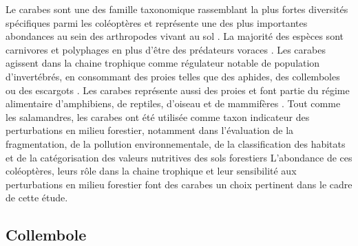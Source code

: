 Le carabes sont une des famille taxonomique rassemblant la plus fortes diversités spécifiques parmi les coléoptères et représente une des plus importantes abondances au sein des arthropodes vivant au sol \citep{loveiEcologyBehaviorGround1996,Rochefort2006GroundBeetle}.
La majorité des espèces sont carnivores et polyphages en plus d’être des prédateurs voraces \citep{loveiEcologyBehaviorGround1996}. 
Les carabes agissent dans la chaine trophique comme régulateur notable de population d’invertébrés, en consommant des proies telles que des aphides, des collemboles ou des escargots \citep{loveiEcologyBehaviorGround1996}. 
Les carabes représente aussi des proies et font partie du régime alimentaire d’amphibiens, de reptiles, d’oiseau et de mammifères \citep{loveiEcologyBehaviorGround1996}. 
Tout comme les salamandres, les carabes ont été utilisée comme taxon indicateur des perturbations en milieu forestier, notamment dans l'évaluation de la fragmentation, 
de la pollution environnementale, de la classification des habitats et de la catégorisation des valeurs nutritives des sols forestiers \citep{bouchardBeetleCommunityResponse2016b,Halme1993Carabidbeetles,Luff1992Classificationprediction,Pizzolotto1994GroundBeetles,Niemela2001Carabidbeetles,Rainio2003Groundbeetles,Work2008Evaluationcarabid}
L’abondance de ces coléoptères, leurs rôle dans la chaine trophique et leur sensibilité aux perturbations en milieu forestier font des carabes un choix pertinent dans le cadre de cette étude. 



\subsection*{Collembole}


